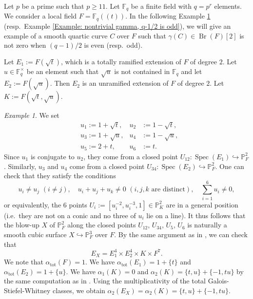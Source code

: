\documentclass{amsart}
\theoremstyle{definition}
\theoremstyle{remark}
\newtheorem{examp}[prop]{Example}
\DeclareMathOperator{\Spec}{Spec}
\DeclareMathOperator{\Br}{Br}
\newcommand{\PP}{\mathbb P}
\newcommand{\Fq}{\mathbb F_q}
\begin{document}
Let $p$ be a prime such that $p \geq 11$.
    Let $\Fq$ be a finite field with $q=p^r$ elements.
    We consider a local field $F=\Fq((t))$.
In the following Example \ref{Example: nontrivial gamma, q-1/2 is even} (resp.\ Example \ref{Example: nontrivial gamma, q-1/2 is odd}), we will give an example of a smooth quartic curve $C$ over $F$ such that
$\gamma(C) \in \Br(F)[2]$
is not zero when $(q-1)/2$ is even (resp.\ odd).

Let $E_1:=F(\sqrt{t})$, which is a totally ramified extension of $F$ of degree $2$.
    Let $u \in \Fq^\times$ be an element such that $\sqrt{u}$ is not contained in $\Fq$ and let
    $E_2:=F(\sqrt{u})$.
    Then $E_2$ is an unramified extension of $F$ of degree $2$.
    Let $K:=F(\sqrt{t}, \sqrt{u})$.


\begin{examp}\label{Example: nontrivial gamma, q-1/2 is even}
    We set
    \begin{align*}
        &u_1:= 1 + \sqrt{t}, &u_2 &:= 1 - \sqrt{t}, \\
        &u_3:= 1 + \sqrt{u}, &u_4 &:= 1 - \sqrt{u}, \\
        &u_5:= 2 + t, &u_6 &:= t.
    \end{align*}
    Since $u_1$ is conjugate to $u_2$, they come from a closed point
    $U_{12} \colon \Spec (E_1) \hookrightarrow \PP^2_{F}$.
    Similarly, $u_3$ and $u_4$ come from a closed point
    $U_{34} \colon \Spec (E_2) \hookrightarrow \PP^2_{F}$.
    One can check that they satisfy the conditions
    \[
    u_i \neq u_j \, \,  (i \neq j), \quad u_i+u_j+u_k \neq 0 \, \, (\text{$i, j, k$ are distinct}), \quad \sum^6_{i=1} u_i \neq 0, 
    \]
    or equivalently, the $6$ points $U_i:=[u^{-2}_i, u^{-3}_i, 1] \in \PP^2_{K}$ are in a general position (i.e.\ they are not on a conic and no three of $u_i$ lie on a line).
    It thus follows that the blow-up $X$ of $\PP^2_{F}$ along the closed points $U_{12}$, $U_{34}$, $U_5$, $U_6$ is naturally a smooth cubic surface $X \hookrightarrow \PP^3_{F}$ over $F$.
    By the same argument as in \cite[Section 3.4]{Lorenzo-Pirisi}, we can check that
    \[
    E_X = E^4_1 \times E^4_2 \times K \times F^7.
    \]
    We note that $\alpha_{\mathrm{tot}}(F)= 1$.
    We have $\alpha_{\mathrm{tot}}(E_1)= 1 + \{ t  \}$ and $\alpha_{\mathrm{tot}}(E_2)= 1 + \{ u  \}$.
    We have $\alpha_1(K) = 0$ and $\alpha_2(K) = \{ t, u \} + \{ -1, tu \}$ by the same computation as in \cite[Example 3.11]{Lorenzo-Pirisi}.
    Using the multiplicativity of the total Galois-Stiefel-Whitney classes, we obtain $\alpha_2(E_X) = \alpha_2(K) = \{ t, u \} + \{ -1, tu \}$.


\end{examp}
\end{document}
